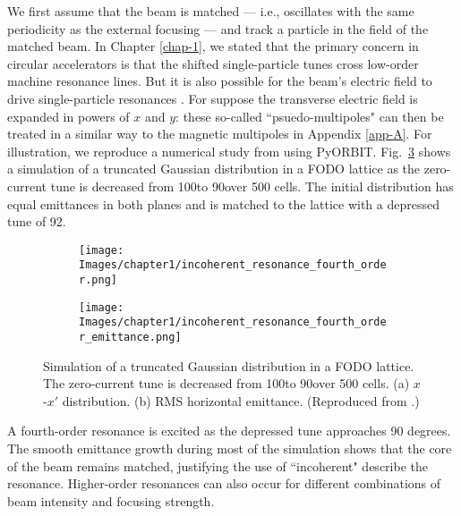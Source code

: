 We first assume that the beam is matched — i.e., oscillates with the same periodicity as the external focusing — and track a particle in the field of the matched beam. In Chapter \ref{chap-1}, we stated that the primary concern in circular accelerators is that the shifted single-particle tunes cross low-order machine resonance lines. But it is also possible for the beam's electric field to drive single-particle resonances \cite{Holmes1999, Jeon1999, Li2014, Kojima2019, Asvesta2020}. For suppose the transverse electric field is expanded in powers of $x$ and $y$: these so-called ``psuedo-multipoles" can then be treated in a similar way to the magnetic multipoles in Appendix \ref{app-A}. For illustration, we reproduce a numerical study from \cite{Hofmann2017Book} using PyORBIT. Fig.~\ref{fig:incoherent_instability} shows a simulation of a truncated Gaussian distribution in a FODO lattice as the zero-current tune is decreased from 100\degree to 90\degree over 500 cells. The initial distribution has equal emittances in both planes and is matched to the lattice with a depressed tune of 92\degree.
%
\begin{figure}[!p]
    \centering
    \vspace*{2cm}
    \begin{subfigure}{\textwidth}
        \texttt{[image: Images/chapter1/incoherent\_resonance\_fourth\_order.png]}
        \label{fig:incoherent_instability_a}
        \caption{}
    \end{subfigure}
    \begin{subfigure}{0.5\textwidth}
        \texttt{[image: Images/chapter1/incoherent\_resonance\_fourth\_order\_emittance.png]}
        \label{fig:incoherent_instability_b}
        \caption{}
    \end{subfigure}
    \caption{Simulation of a truncated Gaussian distribution in a FODO lattice. The zero-current tune is decreased from 100\degree to 90\degree over 500 cells. (a) $x$-$x'$ distribution. (b) RMS horizontal emittance. (Reproduced from \cite{Hofmann2017Book}.)}
    \label{fig:incoherent_instability}
    \vspace*{2cm}
\end{figure}
%
A fourth-order resonance is excited as the depressed tune approaches 90 degrees. The smooth emittance growth during most of the simulation shows that the core of the beam remains matched, justifying the use of ``incoherent" describe the resonance. Higher-order resonances can also occur for different combinations of beam intensity and focusing strength.





